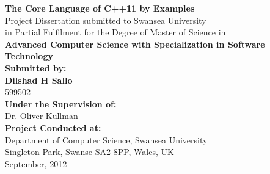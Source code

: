 \documentclass[11pt]{report}
\begin{document}
\begin{titlepage}
\centering
\Large \textbf{The Core Language of C++11 by Examples}\\ \vspace{20pt}
Project Dissertation submitted to Swansea University\\ \vspace{6pt}
in Partial Fulfilment for the Degree of Master of Science in\\ \vspace{12pt}
\textbf{Advanced Computer Science with Specialization in Software Technology}\\ \vspace{30pt}
\large \textbf{Submitted by:}\\ \vspace{6pt}
\textbf{Dilshad H Sallo}\\ \vspace{6pt}
599502 \\ \vspace{30pt}
\textbf{Under the Supervision of:}\\ \vspace{6pt}
Dr. Oliver Kullman\\ \vspace{30pt}
\textbf{Project Conducted at:}\\ \vspace{6pt}
Department of Computer Science, Swansea University\\ \vspace{6pt}
Singleton Park, Swanse SA2 8PP, Wales, UK\\ \vspace{6pt}
September, 2012\\ \vspace{12pt}
\end{titlepage}
\end{document}
